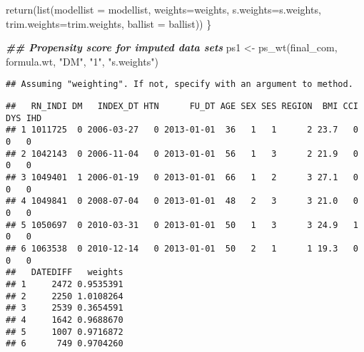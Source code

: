 \documentclass[
]{book}
\newenvironment{Shaded}{\begin{snugshade}}{\end{snugshade}}
\newcommand{\AttributeTok}[1]{\textcolor[rgb]{0.77,0.63,0.00}{#1}}
\newcommand{\DocumentationTok}[1]{\textcolor[rgb]{0.56,0.35,0.01}{\textbf{\textit{#1}}}}
\newcommand{\FunctionTok}[1]{\textcolor[rgb]{0.00,0.00,0.00}{#1}}
\newcommand{\NormalTok}[1]{#1}
\newcommand{\OtherTok}[1]{\textcolor[rgb]{0.56,0.35,0.01}{#1}}
\newcommand{\SpecialCharTok}[1]{\textcolor[rgb]{0.00,0.00,0.00}{#1}}
\newcommand{\StringTok}[1]{\textcolor[rgb]{0.31,0.60,0.02}{#1}}
\begin{document}
\begin{Shaded}
\begin{Highlighting}[]
  \FunctionTok{return}\NormalTok{(}\FunctionTok{list}\NormalTok{(}\AttributeTok{modellist =}\NormalTok{ modellist, }\AttributeTok{weights=}\NormalTok{weights, }\AttributeTok{s.weights=}\NormalTok{s.weights, }\AttributeTok{trim.weights=}\NormalTok{trim.weights, }\AttributeTok{ballist =}\NormalTok{ ballist))}
\NormalTok{\}}
\end{Highlighting}
\end{Shaded}

\begin{Shaded}
\begin{Highlighting}[]
\DocumentationTok{\#\# Propensity score for imputed data sets}
\NormalTok{ps1 }\OtherTok{\textless{}{-}} \FunctionTok{ps\_wt}\NormalTok{(final\_com, formula.wt, }\StringTok{"DM"}\NormalTok{, }\StringTok{"1"}\NormalTok{, }\StringTok{"s.weights"}\NormalTok{)}
\end{Highlighting}
\end{Shaded}

\begin{verbatim}
## Assuming "weighting". If not, specify with an argument to method.
\end{verbatim}

\begin{Shaded}
\end{Shaded}

\begin{verbatim}
##   RN_INDI DM   INDEX_DT HTN      FU_DT AGE SEX SES REGION  BMI CCI DYS IHD
## 1 1011725  0 2006-03-27   0 2013-01-01  36   1   1      2 23.7   0   0   0
## 2 1042143  0 2006-11-04   0 2013-01-01  56   1   3      2 21.9   0   0   0
## 3 1049401  1 2006-01-19   0 2013-01-01  66   1   2      3 27.1   0   0   0
## 4 1049841  0 2008-07-04   0 2013-01-01  48   2   3      3 21.0   0   0   0
## 5 1050697  0 2010-03-31   0 2013-01-01  50   1   3      3 24.9   1   0   0
## 6 1063538  0 2010-12-14   0 2013-01-01  50   2   1      1 19.3   0   0   0
##   DATEDIFF   weights
## 1     2472 0.9535391
## 2     2250 1.0108264
## 3     2539 0.3654591
## 4     1642 0.9688670
## 5     1007 0.9716872
## 6      749 0.9704260
\end{verbatim}
\end{document}
